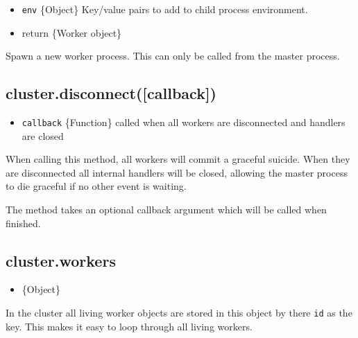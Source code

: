\begin{itemize}
\item
  \texttt{env} \{Object\} Key/value pairs to add to child process
  environment.
\item
  return \{Worker object\}
\end{itemize}

Spawn a new worker process. This can only be called from the master
process.

\subsection{cluster.disconnect({[}callback{]})}

\begin{itemize}
\item
  \texttt{callback} \{Function\} called when all workers are
  disconnected and handlers are closed
\end{itemize}

When calling this method, all workers will commit a graceful suicide.
When they are disconnected all internal handlers will be closed,
allowing the master process to die graceful if no other event is
waiting.

The method takes an optional callback argument which will be called when
finished.

\subsection{cluster.workers}

\begin{itemize}
\item
  \{Object\}
\end{itemize}

In the cluster all living worker objects are stored in this object by
there \texttt{id} as the key. This makes it easy to loop through all
living workers.

\begin{Shaded}
\begin{Highlighting}[]
 
   \NormalTok{(}  \NormalTok{) \{}
    \NormalTok{[id]);}
  \NormalTok{\}}
\NormalTok{\}}
  \NormalTok{(}\NormalTok{);}
\NormalTok{\});}
\end{Highlighting}
\end{Shaded}

